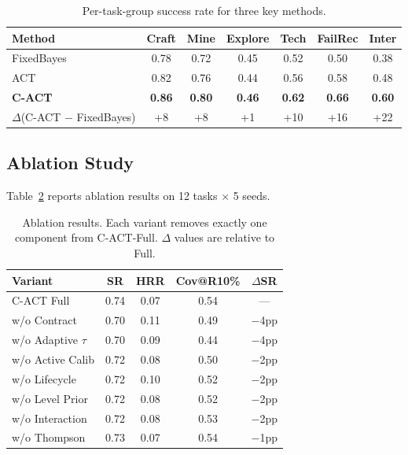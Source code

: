 \documentclass[letterpaper]{article}
\begin{document}
\begin{table}[t]
\centering
\caption{Per-task-group success rate for three key methods.}
\label{tab:bygroup}
\begin{tabular}{lcccccc}
\toprule
\textbf{Method} & \textbf{Craft} & \textbf{Mine} & \textbf{Explore} & \textbf{Tech} & \textbf{FailRec} & \textbf{Inter} \\
\midrule
FixedBayes      & 0.78 & 0.72 & 0.45 & 0.52 & 0.50 & 0.38 \\
ACT             & 0.82 & 0.76 & 0.44 & 0.56 & 0.58 & 0.48 \\
\textbf{C-ACT}  & \textbf{0.86} & \textbf{0.80} & \textbf{0.46} & \textbf{0.62} & \textbf{0.66} & \textbf{0.60} \\
\midrule
$\Delta$(C-ACT $-$ FixedBayes) & +8 & +8 & +1 & +10 & +16 & +22 \\
\bottomrule
\end{tabular}
\end{table}

\subsection{Ablation Study}

Table~\ref{tab:ablation} reports ablation results on 12 tasks $\times$ 5 seeds.

\begin{table}[t]
\centering
\caption{Ablation results. Each variant removes exactly one component from \textsc{C-ACT}-Full. $\Delta$ values are relative to Full.}
\label{tab:ablation}
\begin{tabular}{lcccc}
\toprule
\textbf{Variant} & \textbf{SR} & \textbf{HRR} & \textbf{Cov@R10\%} & \textbf{$\Delta$SR} \\
\midrule
C-ACT Full          & 0.74 & 0.07 & 0.54 & --- \\
w/o Contract        & 0.70 & 0.11 & 0.49 & $-$4pp \\
w/o Adaptive $\tau$ & 0.70 & 0.09 & 0.44 & $-$4pp \\
w/o Active Calib    & 0.72 & 0.08 & 0.50 & $-$2pp \\
w/o Lifecycle       & 0.72 & 0.10 & 0.52 & $-$2pp \\
w/o Level Prior     & 0.72 & 0.08 & 0.52 & $-$2pp \\
w/o Interaction     & 0.72 & 0.08 & 0.53 & $-$2pp \\
w/o Thompson        & 0.73 & 0.07 & 0.54 & $-$1pp \\
\bottomrule
\end{tabular}
\end{table}
\end{document}
